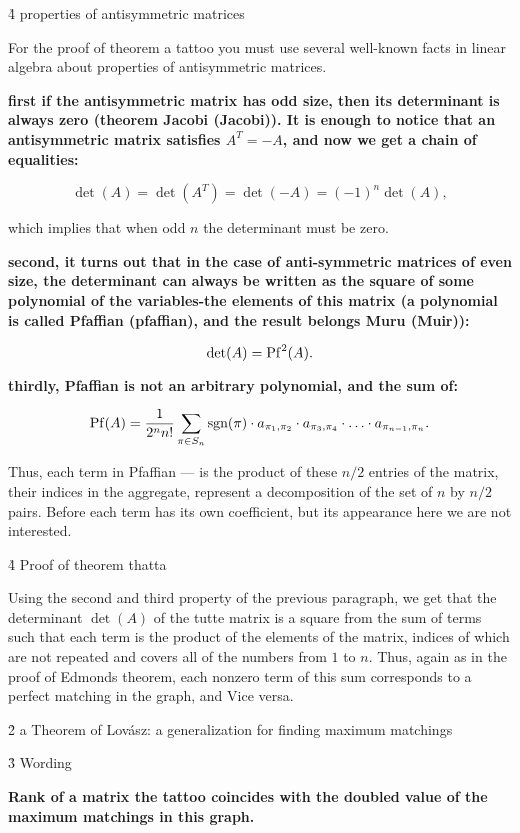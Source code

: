 \h4{ properties of antisymmetric matrices }

For the proof of theorem a tattoo you must use several well-known facts in linear algebra about properties of antisymmetric matrices.

\bf{first} if the antisymmetric matrix has odd size, then its determinant is always zero (theorem Jacobi (Jacobi)). It is enough to notice that an antisymmetric matrix satisfies $A^T = -A$, and now we get a chain of equalities:

$$ \det(A) = \det(A^T) = \det(-A) = (-1)^n \det(A), $$

which implies that when odd $n$ the determinant must be zero.

\bf{second}, it turns out that in the case of anti-symmetric matrices of even size, the determinant can always be written as the square of some polynomial of the variables-the elements of this matrix (a polynomial is called Pfaffian (pfaffian), and the result belongs Muru (Muir)):

$$ \det(A) = {\rm Pf}^2(A). $$

\bf{thirdly}, Pfaffian is not an arbitrary polynomial, and the sum of:

$$ {\rm Pf}(A) = \frac{ 1 }{ 2^n n! } \sum_{\pi \in S_n} {\rm sgn(\pi)} \cdot a_{\pi_1,\pi_2} \cdot a_{\pi_3,\pi_4} \cdot \ldots \cdot a_{\pi_{n-1},\pi_n}. $$

Thus, each term in Pfaffian --- is the product of these $n/2$ entries of the matrix, their indices in the aggregate, represent a decomposition of the set of $n$ by $n/2$ pairs. Before each term has its own coefficient, but its appearance here we are not interested.


\h4{ Proof of theorem thatta }

Using the second and third property of the previous paragraph, we get that the determinant $\det(A)$ of the tutte matrix is a square from the sum of terms such that each term is the product of the elements of the matrix, indices of which are not repeated and covers all of the numbers from $1$ to $n$. Thus, again as in the proof of Edmonds theorem, each nonzero term of this sum corresponds to a perfect matching in the graph, and Vice versa.


\h2{ a Theorem of Lovász: a generalization for finding maximum matchings }


\h3{ Wording }

\bf{Rank} of a matrix the tattoo coincides with the doubled value of the \bf{maximum matchings} in this graph.


